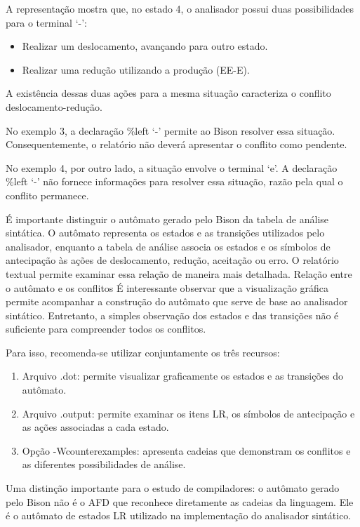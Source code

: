 \documentclass[
  brazilian,
  letterpaper,
]{book}
\providecommand{\tightlist}{%
  \setlength{\itemsep}{0pt}\setlength{\parskip}{0pt}}
\theoremstyle{plain}
\theoremstyle{definition}
\theoremstyle{remark}
\begin{document}
A representação mostra que, no estado 4, o analisador possui duas
possibilidades para o terminal `-':

\begin{itemize}
\tightlist
\item
  Realizar um deslocamento, avançando para outro estado.
\item
  Realizar uma redução utilizando a produção (E\rightarrow E-E).
\end{itemize}

A existência dessas duas ações para a mesma situação caracteriza o
conflito deslocamento-redução.

No exemplo 3, a declaração \%left `-' permite ao Bison resolver essa
situação. Consequentemente, o relatório não deverá apresentar o conflito
como pendente.

No exemplo 4, por outro lado, a situação envolve o terminal `e'. A
declaração \%left `-' não fornece informações para resolver essa
situação, razão pela qual o conflito permanece.

É importante distinguir o autômato gerado pelo Bison da tabela de
análise sintática. O autômato representa os estados e as transições
utilizados pelo analisador, enquanto a tabela de análise associa os
estados e os símbolos de antecipação às ações de deslocamento, redução,
aceitação ou erro. O relatório textual permite examinar essa relação de
maneira mais detalhada. Relação entre o autômato e os conflitos É
interessante observar que a visualização gráfica permite acompanhar a
construção do autômato que serve de base ao analisador sintático.
Entretanto, a simples observação dos estados e das transições não é
suficiente para compreender todos os conflitos.

Para isso, recomenda-se utilizar conjuntamente os três recursos:

\begin{enumerate}
\def\labelenumi{\arabic{enumi}.}
\tightlist
\item
  Arquivo .dot: permite visualizar graficamente os estados e as
  transições do autômato.
\item
  Arquivo .output: permite examinar os itens LR, os símbolos de
  antecipação e as ações associadas a cada estado.
\item
  Opção -Wcounterexamples: apresenta cadeias que demonstram os conflitos
  e as diferentes possibilidades de análise.
\end{enumerate}

Uma distinção importante para o estudo de compiladores: o autômato
gerado pelo Bison não é o AFD que reconhece diretamente as cadeias da
linguagem. Ele é o autômato de estados LR utilizado na implementação do
analisador sintático.
\end{document}

